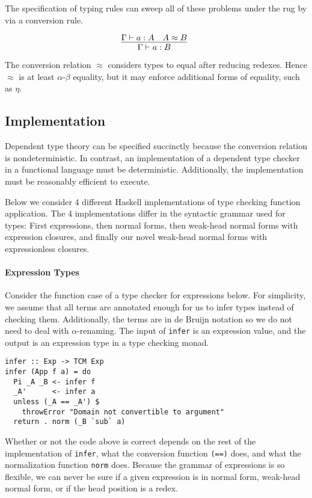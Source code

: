 \documentclass[preprint,authoryear]{sigplanconf}
\def\turn{\vdash}
\def\conv{\approx}
\begin{document}
The specification of typing rules can sweep all of these
problems under the rug by via a conversion rule.

$$
\infer[]
  {\Gamma \turn a : B}
{
  \Gamma \turn a : A
  &
  A \conv B
}
$$

The conversion relation $\conv$ considers types to equal after
reducing redexes. Hence $\conv$ is at least $\alpha$-$\beta$
equality, but it may enforce additional forms of equality, such as $\eta$.

\subsection{Implementation}

Dependent type theory can be specified succinctly because the
conversion relation is nondeterministic. In contrast, an
implementation of a dependent type checker in a functional language
must be deterministic. Additionally, the implementation must be
reasonably efficient to execute. 

Below we consider 4 different Haskell implementations of type checking
function application. The 4 implementations differ in the syntactic
grammar used for types: First expressions, then normal forms, then
weak-head normal forms with expression closures, and finally our novel
weak-head normal forms with expressionless closures.

\paragraph{Expression Types}

Consider the function case of a type checker for expressions below.
For simplicity, we assume that all terms are annotated enough for us
to infer types instead of checking them. Additionally, the terms are
in de Bruijn notation so we do not need to deal with $\alpha$-renaming.
The input of \texttt{infer} is an expression
value, and the output is an expression type in a type checking monad.

\begin{verbatim}
infer :: Exp -> TCM Exp
infer (App f a) = do
  Pi _A _B <- infer f
  _A'      <- infer a
  unless (_A == _A') $
    throwError "Domain not convertible to argument"
  return . norm (_B `sub` a)
\end{verbatim}

Whether or not the code above is correct depends on the rest of the
implementation of \texttt{infer}, what the conversion function
\texttt{(==)} does, and what the normalization function
\texttt{norm} does. Because the grammar of expressions is so flexible,
we can never be sure if a given expression is in normal form,
weak-head normal form, or if the head position is a redex.
\end{document}

